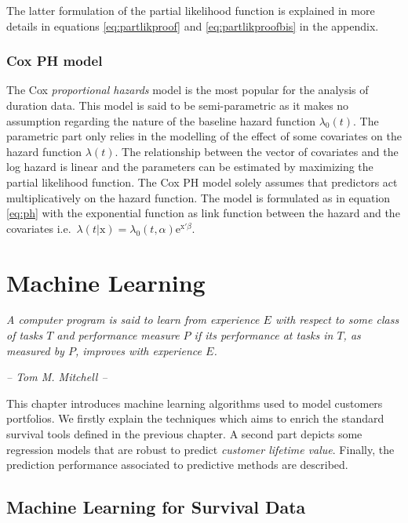 \documentclass[
]{book}
\begin{document}
The latter formulation of the partial likelihood function is explained in more details in equations \eqref{eq:partlikproof} and \eqref{eq:partlikproofbis} in the appendix.

\hypertarget{cox-ph-model}{%
\subsection{Cox PH model}\label{cox-ph-model}}

The Cox \emph{proportional hazards} model is the most popular for the analysis of duration data. This model is said to be semi-parametric as it makes no assumption regarding the nature of the baseline hazard function \(\lambda_0(t)\). The parametric part only relies in the modelling of the effect of some covariates on the hazard function \(\lambda(t)\). The relationship between the vector of covariates and the log hazard is linear and the parameters can be estimated by maximizing the partial likelihood function. The Cox PH model solely assumes that predictors act multiplicatively on the hazard function. The model is formulated as in equation \eqref{eq:ph} with the exponential function as link function between the hazard and the covariates i.e.~\(\lambda(t|\pmb{\mathrm{x}}) = \lambda_0 (t,\alpha) \text{e}^{\pmb{\mathrm{x'}} \beta}\).

\hypertarget{ml}{%
\chapter{Machine Learning}\label{ml}}

\emph{A computer program is said to learn from experience \(E\) with respect to some class of tasks \(T\) and performance measure \(P\) if its performance at tasks in \(T\), as measured by \(P\), improves with experience \(E\).}

\emph{-- Tom M. Mitchell --}

This chapter introduces machine learning algorithms used to model customers portfolios. We firstly explain the techniques which aims to enrich the standard survival tools defined in the previous chapter. A second part depicts some regression models that are robust to predict \emph{customer lifetime value}. Finally, the prediction performance associated to predictive methods are described.

\hypertarget{machine-learning-for-survival-data}{%
\section{Machine Learning for Survival Data}\label{machine-learning-for-survival-data}}
\end{document}
